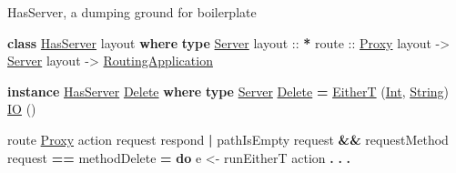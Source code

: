 \documentclass[ignorenonframetext,]{beamer}
\newenvironment{Shaded}{}{}
\newcommand{\KeywordTok}[1]{\textcolor[rgb]{0.26,0.66,0.93}{\textbf{{#1}}}}
\newcommand{\DataTypeTok}[1]{\underline{{#1}}}
\newcommand{\OtherTok}[1]{{#1}}
\newcommand{\FunctionTok}[1]{\textcolor[rgb]{1.00,0.58,0.35}{\textbf{{#1}}}}
\newcommand{\NormalTok}[1]{{#1}}
\begin{document}
\begin{frame}[fragile]{HasServer, a dumping ground for boilerplate}

\begin{Shaded}
\begin{Highlighting}[]
\KeywordTok{class} \DataTypeTok{HasServer} \NormalTok{layout }\KeywordTok{where}
  \KeywordTok{type} \DataTypeTok{Server}\OtherTok{ layout ::} \FunctionTok{*}
\OtherTok{  route ::} \DataTypeTok{Proxy} \NormalTok{layout}
        \OtherTok{->} \DataTypeTok{Server} \NormalTok{layout}
        \OtherTok{->} \DataTypeTok{RoutingApplication}

\KeywordTok{instance} \DataTypeTok{HasServer} \DataTypeTok{Delete} \KeywordTok{where}
  \KeywordTok{type} \DataTypeTok{Server} \DataTypeTok{Delete} \FunctionTok{=} \DataTypeTok{EitherT} \NormalTok{(}\DataTypeTok{Int}\NormalTok{, }\DataTypeTok{String}\NormalTok{) }\DataTypeTok{IO} \NormalTok{()}

  \NormalTok{route }\DataTypeTok{Proxy} \NormalTok{action request respond}
    \FunctionTok{|} \NormalTok{pathIsEmpty request}
    \FunctionTok{&&} \NormalTok{requestMethod request }\FunctionTok{==} \NormalTok{methodDelete }\FunctionTok{=} \KeywordTok{do}
        \NormalTok{e }\OtherTok{<-} \NormalTok{runEitherT action}
        \FunctionTok{.} \FunctionTok{.} \FunctionTok{.}
\end{Highlighting}
\end{Shaded}

\end{frame}
\end{document}
